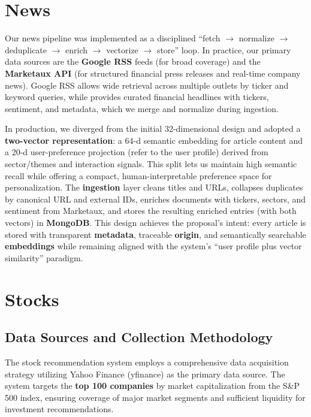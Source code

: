 \section{News}

Our news pipeline was implemented as a disciplined “fetch $\rightarrow$ normalize $\rightarrow$ deduplicate $\rightarrow$ enrich $\rightarrow$ vectorize $\rightarrow$ store” loop. In practice, our primary data sources are the \textbf{Google \acs{RSS}} feeds (for broad coverage) and the \textbf{Marketaux \acs{API}} (for structured financial press releases and real-time company news). Google \acs{RSS} allows wide retrieval across multiple outlets by ticker and keyword queries, while \Marketaux provides curated financial headlines with tickers, sentiment, and metadata, which we merge and normalize during ingestion.

In production, we diverged from the initial 32-dimensional design and adopted a \textbf{two-vector representation}: a 64-d semantic embedding for article content and a 20-d user-preference projection (refer to the user profile) derived from sector/themes and interaction signals. This split lets us maintain high semantic recall while offering a compact, human-interpretable preference space for personalization. The \textbf{ingestion} layer cleans titles and URLs, collapses duplicates by canonical URL and external IDs, enriches documents with tickers, sectors, and sentiment from Marketaux, and stores the resulting enriched entries (with both vectors) in \textbf{MongoDB}. This design achieves the proposal’s intent: every article is stored with transparent \textbf{metadata}, traceable \textbf{origin}, and semantically searchable \textbf{embeddings} while remaining aligned with the system’s “user profile plus vector similarity” paradigm.




\section{Stocks}

\subsection{Data Sources and Collection Methodology}
The stock recommendation system employs a comprehensive data acquisition strategy utilizing Yahoo Finance (yfinance) as the primary data source. The system targets the \textbf{top 100 companies} by market capitalization from the S\&P 500 index, ensuring coverage of major market segments and sufficient liquidity for investment recommendations.

